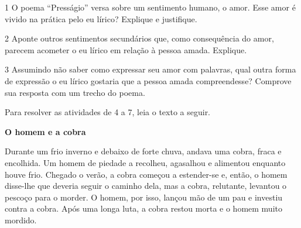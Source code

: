 \num{1} O poema ``Presságio'' versa sobre um sentimento humano, o amor.
Esse amor é vivido na prática pelo eu lírico? Explique e justifique.


\num{2} Aponte outros sentimentos secundários que, como consequência do
amor, parecem acometer o eu lírico em relação à pessoa amada. Explique.



\num{3} Assumindo não saber como expressar seu amor com palavras, qual
outra forma de expressão o eu lírico gostaria que a pessoa amada
compreendesse? Comprove sua resposta com um trecho do poema.



\pagebreak

Para resolver as atividades de 4 a 7, leia o texto a seguir.

\begin{myquote}
\centering\textbf{O homem e a cobra}

Durante um frio inverno e debaixo de forte chuva, andava uma cobra,
fraca e encolhida. Um homem de piedade a recolheu, agasalhou e alimentou
enquanto houve frio. Chegado o verão, a cobra começou a estender-se e,
então, o homem disse-lhe que deveria seguir o caminho dela, mas a cobra,
relutante, levantou o pescoço para o morder. O homem, por isso, lançou
mão de um pau e investiu contra a cobra. Após uma longa luta, a cobra
restou morta e o homem muito mordido.

\end{myquote}


